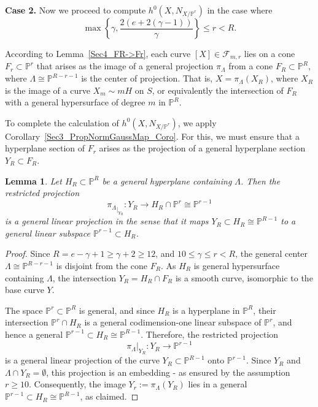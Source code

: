 \documentclass[a4paper,12pt]{amsart}
\newtheorem{lemma}[thm]{Lemma}
\begin{document}
{\bf Case 2.}
Now we proceed to compute $h^0 (X, N_{X/\mathbb{P}^r})$ in the case where
\[
 \max \left\lbrace \gamma, \frac{2(e+2(\gamma-1))}{\gamma} \right\rbrace \leq r < R .
\]

According to \textnormal{Lemma~\ref{Sec4_FR->Fr}}, each curve $[X] \in \mathcal{F}_{m,r}$ lies on a cone $F_r \subset \mathbb{P}^r$ that arises as the image of a general projection $\pi_{\Lambda}$ from a cone $F_R \subset \mathbb{P}^R$, where $\Lambda \cong \mathbb{P}^{R-r-1}$ is the center of projection. That is, $X = \pi_{\Lambda} (X_R)$, where $X_R$ is the image of a curve $X_m \sim mH$ on $S$, or equivalently the intersection of $F_R$ with a general hypersurface of degree $m$ in $\mathbb{P}^R$.

To complete the calculation of $h^0  (X, N_{X/\mathbb{P}^r})$, we apply \textnormal{Corollary~\ref{Sec3_PropNormGaussMap_Coro}}. For this, we must ensure that a hyperplane section of $F_r$ arises as the projection of a general hyperplane section $Y_R \subset F_R$.

\begin{lemma}\label{Sec4_YR->Yr-general}
Let $H_R \subset \mathbb{P}^R$ be a general hyperplane containing $\Lambda$. Then the restricted projection
\[
 {\pi_{\Lambda}}_{|_{Y_R}} : Y_R \to H_R \cap \mathbb{P}^r \cong \mathbb{P}^{r-1}
\]
is a general linear projection in the sense that it maps $Y_R \subset H_R \cong \mathbb{P}^{R-1}$ to a general linear subspace $\mathbb{P}^{r-1} \subset H_R$.
\end{lemma}
\begin{proof}
Since $R = e - \gamma + 1 \geq \gamma + 2 \geq 12$, and $10 \leq \gamma \leq r < R$, the general center $\Lambda \cong \mathbb{P}^{R-r-1}$ is disjoint from the cone $F_R$. As $H_R$ is general hypersurface containing $\Lambda$, the intersection $Y_R = H_R \cap F_R$ is a smooth curve, isomorphic to the base curve $Y$.

The space $\mathbb{P}^r \subset \mathbb{P}^R $ is general, and since $H_R$ is a hyperplane in $\mathbb{P}^R$, their intersection $\mathbb{P}^r \cap H_R$ is a general codimension-one linear subspace of $\mathbb{P}^r$, and hence a general $\mathbb{P}^{r-1} \subset H_R \cong \mathbb{P}^{R-1}$. Therefore, the restricted projection
 \[
 \pi_{\Lambda}|_{Y_R} : Y_R \to \mathbb{P}^{r-1}
 \]
is a general linear projection of the curve $Y_R \subset \mathbb{P}^{R-1}$ onto $\mathbb{P}^{r-1}$. Since $Y_R$ and $\Lambda \cap Y_R = \emptyset$, this projection is an embedding - as ensured by the assumption $r \geq 10$. Consequently, the image $Y_r := \pi_{\Lambda}(Y_R)$ lies in a general $\mathbb{P}^{r-1} \subset H_R \cong \mathbb{P}^{R-1}$, as claimed.
\end{proof}
\end{document}
